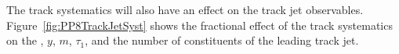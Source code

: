 {The track systematics will also have an effect on the track jet observables. Figure~\ref{fig:PP8TrackJetSyst} shows the fractional effect of the track systematics on the \pt, $y$, $m$, $\tau_1$, and the number of constituents of the leading track jet.

\begin{figure}[h!]
  \centering
   \\
   \\

\end{figure}}
